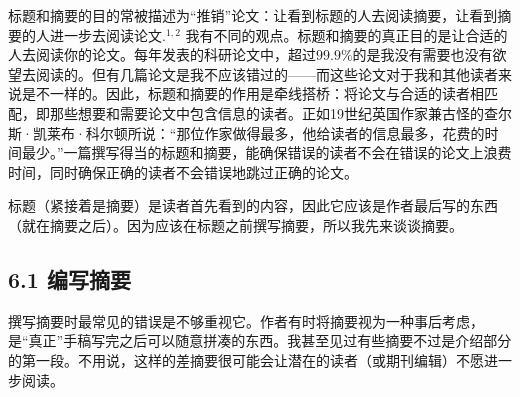 标题和摘要的目的常被描述为“推销”论文：让看到标题的人去阅读摘要，让看到摘要的人进一步去阅读论文.${ }^{1,2}$ 我有不同的观点。标题和摘要的真正目的是让合适的人去阅读你的论文。每年发表的科研论文中，超过$99.9 \%$的是我没有需要也没有欲望去阅读的。但有几篇论文是我不应该错过的——而这些论文对于我和其他读者来说是不一样的。因此，标题和摘要的作用是牵线搭桥：将论文与合适的读者相匹配，即那些想要和需要论文中包含信息的读者。正如19世纪英国作家兼古怪的查尔斯·凯莱布·科尔顿所说：“那位作家做得最多，他给读者的信息最多，花费的时间最少。”一篇撰写得当的标题和摘要，能确保错误的读者不会在错误的论文上浪费时间，同时确保正确的读者不会错误地跳过正确的论文。

标题（紧接着是摘要）是读者首先看到的内容，因此它应该是作者最后写的东西（就在摘要之后）。因为应该在标题之前撰写摘要，所以我先来谈谈摘要。

\subsection*{6.1 编写摘要}
撰写摘要时最常见的错误是不够重视它。作者有时将摘要视为一种事后考虑，是“真正”手稿写完之后可以随意拼凑的东西。我甚至见过有些摘要不过是介绍部分的第一段。不用说，这样的差摘要很可能会让潜在的读者（或期刊编辑）不愿进一步阅读。


